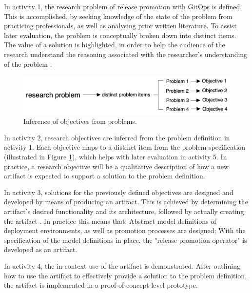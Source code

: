 \noindent
In activity 1,
the research problem of
release promotion with GitOps
is defined.
This is accomplished, by
seeking knowledge of the state of the problem
from practicing professionals,
as well as analysing prior written literature.
To assist later evaluation,
the problem is conceptually broken down into distinct items.
The value of a solution is highlighted,
in order to help the audience of the research
understand the reasoning associated with the
researcher's understanding of the problem
\autocite{designScienceResearchMethodologyForInformationSystemsResearch}.
\bigskip

\begin{figure}[h]
	\centering
	\includegraphics[width=0.75\linewidth]{assets/problem-to-objective-mapping.png}
	\caption{Inference of objectives from problems.
	}
	\label{fig:problemToObjectiveMapping}	
\end{figure}

\noindent
In activity 2,
research objectives are inferred from the problem definition in activity 1.
Each objective maps to a distinct item from the problem specification
(illustrated in Figure \ref{fig:problemToObjectiveMapping}),
which helps with later evaluation in activity 5.
In practice, a research objective will be a qualitative description of
how a new artifact is expected to support a solution to the problem definition.
\bigskip

\noindent
In activity 3,
solutions for the previously defined objectives are designed and developed
by means of producing an artifact.
This is achieved by
determining the artifact's desired functionality and its architecture,
followed by actually creating the artifact
\autocite{designScienceResearchMethodologyForInformationSystemsResearch}.
In practice this means that:
Abstract model definitions of deployment environments, as well as
promotion processes are designed;
With the specification of the model definitions in place,
the "release promotion operator" is developed as an artifact.
\bigskip

\noindent
In activity 4,
the in-context use of the artifact is demonstrated.
After outlining how to use the artifact to effectively provide a solution to the problem definition,
the artifact is implemented in a proof-of-concept-level prototype.
\bigskip

